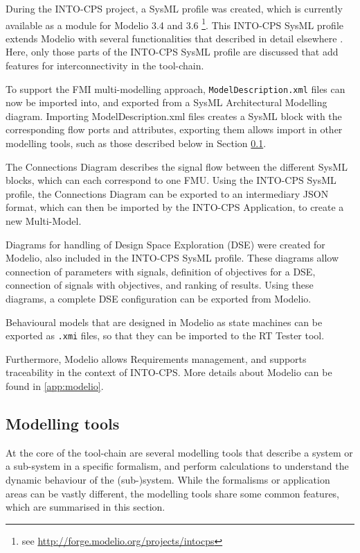 During the INTO-CPS project, a SysML profile was created, which is currently available as a module for Modelio 3.4 and 3.6 \footnote{see \url{http://forge.modelio.org/projects/intocps}}. This INTO-CPS SysML profile extends Modelio with several functionalities that described in detail elsewhere \cite{INTOCPSD41c,INTOCPSD4.2c,INTOCPSD4.3c}. Here, only those parts of the INTO-CPS SysML profile are discussed that add features for interconnectivity in the tool-chain.

To support the FMI multi-modelling approach, \texttt{ModelDescription.xml} files can now be imported into, and exported from a SysML Architectural Modelling diagram. Importing ModelDescription.xml files creates a SysML block with the corresponding flow ports and attributes, exporting them allows import in other modelling tools, such as those described below in Section \ref{sec:tools}.

The Connections Diagram describes the signal flow between the different SysML blocks, which can each correspond to one FMU. Using the INTO-CPS SysML profile, the Connections Diagram can be exported to an intermediary JSON format, which can then be imported by the INTO-CPS Application, to create a new Multi-Model.

Diagrams for handling of Design Space Exploration (DSE) were created for Modelio, also included in the INTO-CPS SysML profile. These diagrams allow connection of parameters with signals, definition of objectives for a DSE, connection of signals with objectives, and ranking of results. Using these diagrams, a complete DSE configuration can be exported from Modelio.

Behavioural models that are designed in Modelio as state machines can be exported as \texttt{.xmi} files, so that they can be imported to the RT Tester tool.

Furthermore, Modelio allows Requirements management, and supports traceability in the context of INTO-CPS. More details about Modelio can be found in \autoref{app:modelio}.

\subsection{Modelling tools}
\label{sec:tools}

At the core of the tool-chain are several modelling tools that describe a system or a sub-system in a specific formalism, and perform calculations to understand the dynamic behaviour of the (sub-)system. While the formalisms or application areas can be vastly different, the modelling tools share some common features, which are summarised in this section. 

